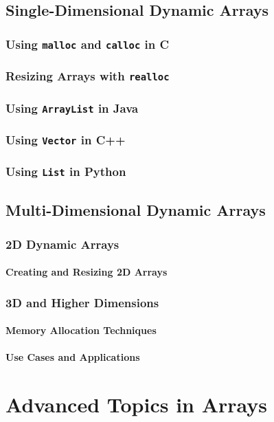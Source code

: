 \documentclass[12pt, oneside]{book}
\begin{document}
	\section{Single-Dimensional Dynamic Arrays}
	\subsection{Using \texttt{malloc} and \texttt{calloc} in C}
	\subsection{Resizing Arrays with \texttt{realloc}}
	\subsection{Using \texttt{ArrayList} in Java}
	\subsection{Using \texttt{Vector} in C++}
	\subsection{Using \texttt{List} in Python}
	
	\section{Multi-Dimensional Dynamic Arrays}
	\subsection{2D Dynamic Arrays}
	\subsubsection{Creating and Resizing 2D Arrays}
	\subsection{3D and Higher Dimensions}
	\subsubsection{Memory Allocation Techniques}
	\subsubsection{Use Cases and Applications}
	
	\chapter{Advanced Topics in Arrays}
	
\end{document}
